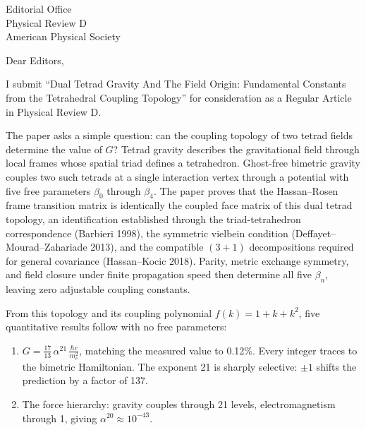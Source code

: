 \documentclass[11pt]{letter}
\begin{document}
\begin{letter}{Editorial Office\\Physical Review D\\American Physical Society}

\opening{Dear Editors,}

I submit ``Dual Tetrad Gravity And The Field Origin: Fundamental Constants from the Tetrahedral Coupling Topology'' for consideration as a Regular Article in Physical Review D.


The paper asks a simple question: can the coupling topology of two tetrad fields determine the value of $G$? Tetrad gravity describes the gravitational field through local frames whose spatial triad defines a tetrahedron. Ghost-free bimetric gravity couples two such tetrads at a single interaction vertex through a potential with five free parameters $\beta_0$ through $\beta_4$. The paper proves that the Hassan--Rosen frame transition matrix is identically the coupled face matrix of this dual tetrad topology, an identification established through the triad-tetrahedron correspondence (Barbieri 1998), the symmetric vielbein condition (Deffayet--Mourad--Zahariade 2013), and the compatible $(3{+}1)$ decompositions required for general covariance (Hassan--Kocic 2018). Parity, metric exchange symmetry, and field closure under finite propagation speed then determine all five $\beta_n$, leaving zero adjustable coupling constants.


From this topology and its coupling polynomial $f(k) = 1 + k + k^2$, five quantitative results follow with no free parameters:
%
\begin{enumerate}
\item $G = \frac{17}{13}\,\alpha^{21}\,\frac{\hbar c}{m_e^2}$, matching the measured value to 0.12\%. Every integer traces to the bimetric Hamiltonian. The exponent 21 is sharply selective: $\pm 1$ shifts the prediction by a factor of 137.

\item The force hierarchy: gravity couples through 21 levels, electromagnetism through 1, giving $\alpha^{20} \approx 10^{-43}$.


\end{enumerate}
\end{letter}
\end{document}
